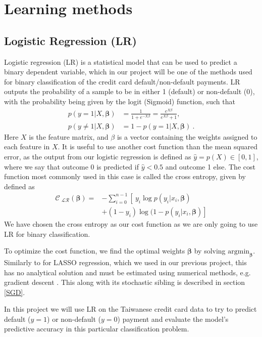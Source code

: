 \documentclass[a4paper, 11pt, twocolumn]{article}
\begin{document}
\section{Learning methods}
\subsection{Logistic Regression (LR)}
Logistic regression (LR)  is a statistical model that can be used to predict a
binary dependent variable, which in our project will be one of the methods used
for binary classification of the credit card default/non-default payments. LR
outputs the probability of a sample to be in either 1 (default) or non-default (0),
with the probability being given by the logit (Sigmoid) function, such that
\begin{align}
p(y=1 | X, \bm{\beta}) &= \frac{1}{1 + e^{-X \beta}} =\frac{e^{X \beta}}{e^{X \beta}+1},\\
p(y\neq1 | X, \bm{\beta}) &= 1 - p(y=1 | X, \bm{\beta})\ .
\label{eq:LR_probability}
\end{align}
Here $X$ is the feature matrix, and $\beta$ is a vector containing the weights
assigned to each feature in $X$. It is useful to use another cost function than
the mean squared error, as the output from our logistic regression is defined as
$\hat{y}=p(X)\in [0, 1]$, where we say that outcome 0 is predicted if
$\hat{y}< 0.5$ and outcome 1 else. The cost function most commonly used in this
case is called the cross entropy, given by
defined as
\begin{align}
\mathcal{C_\text{ LR}}(\bm{\beta}) =& -\sum_{i=0}^{n-1} \left[\  y_i\log p(y_i|x_i, \bm{\beta}) \right. \nonumber\\
 &\left.+ (1-y_i)\log(1-p(y_i|x_i,\bm{\beta})    \right]
\end{align}
We have chosen the cross entropy as our cost function as we are only going to use
LR for binary classification.

To optimize the cost function, we find the optimal weights $\bm{\beta}$ by
solving $\text{argmin}_{\bm{\beta}}$. Similarly to for LASSO regression, which
we used in our previous project, this has no analytical solution and must be
estimated using numerical methods, e.g. gradient descent \cite{regpaper}. This
along with its stochastic sibling is described in section \ref{SGD}.

In this project we will use LR on the Taiwanese credit card data to try to predict
default ($y=1$) or non-default ($y=0$) payment and evaluate the model's predictive
accuracy in this particular classification problem.
\end{document}
